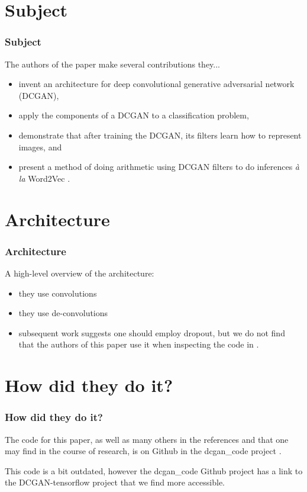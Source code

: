 \documentclass{beamer}
\begin{document}
\section{Subject}
\begin{frame}
\frametitle{Subject}

The authors of the paper make several contributions they...
\begin{itemize}
  \item invent an architecture for deep convolutional generative adversarial network (DCGAN),
  \item apply the components of a DCGAN to a classification problem,
  \item demonstrate that after training the DCGAN, its filters learn how to
    represent images, and
  \item present a method of doing arithmetic using DCGAN filters to do 
    inferences \emph{{\`a} la} Word2Vec \cite{word2Vec}.
\end{itemize}
\end{frame}

\section{Architecture}
\begin{frame}
\frametitle{Architecture}
A high-level overview of the architecture:
\begin{itemize}
  \item they use convolutions
  \item they use de-convolutions
  \item subsequent work \cite{deepLearnR} \cite{deepLearnBookGenCh} suggests one
   should employ dropout, but we do not find that the authors of this paper use it
   when inspecting the code in \cite{dcganCode}.
\end{itemize}
\end{frame}

\section{How did they do it?}
\begin{frame}
\frametitle{How did they do it?}
The code for this paper, as well as many others in the references and
that one may find in the course of research, is on Github in the dcgan\_code
project \cite{dcganCode}.

This code is a bit outdated, however the dcgan\_code Github project has a link
to the DCGAN-tensorflow \cite{dcganTf} project that we find more accessible.
\end{frame}
\end{document}
